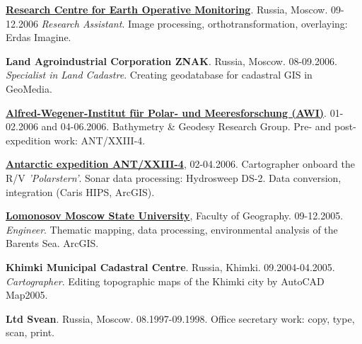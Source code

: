 \documentclass[10pt]{article}
\renewcommand{\section}[2]%
        {\pagebreak[2]\vspace{1.3\baselineskip}%
         \phantomsection\addcontentsline{toc}{section}{#1}%
         \hspace{0in}%
         \marginpar{
         \raggedright \scshape #1}#2}
\begin{document}
\href{http://eng.ntsomz.ru/}{\textbf{Research Centre for Earth Operative Monitoring}}. Russia, Moscow. 09-12.2006 \textit{Research Assistant}. Image processing, orthotransformation, overlaying: Erdas Imagine.
\vspace{5pt}

\textbf{Land Agroindustrial Corporation ZNAK}. Russia, Moscow. 08-09.2006. \textit{Specialist in Land Cadastre}. Creating geodatabase for cadastral GIS in GeoMedia.
\vspace{5pt}

\href{https://www.awi.de/}{\textbf{Alfred-Wegener-Institut f\"{u}r Polar- und Meeresforschung (AWI)}}. 01-02.2006 and 04-06.2006. Bathymetry \& Geodesy Research Group. Pre- and post-expedition work: ANT/XXIII-4.
\vspace{5pt}

\href{http://www.ats.aq/documents/ie/deanu06e.pdf}{\textbf{Antarctic expedition ANT/XXIII-4}}, 02-04.2006. Cartographer onboard the R/V \textit{'Polarstern'}. Sonar data processing: Hydrosweep DS-2. Data conversion, integration (Caris HIPS, ArcGIS). 
\vspace{5pt}

\href{http://www.msu.ru/en/}{\textbf{Lomonosov Moscow State University}}, Faculty of Geography. 09-12.2005. \textit{Engineer}. Thematic mapping, data processing, environmental analysis of the Barents Sea. ArcGIS.
\vspace{5pt}

\textbf{Khimki Municipal Cadastral Centre}. Russia, Khimki. 09.2004-04.2005. \textit{Cartographer}. Editing topographic maps of the Khimki city by AutoCAD Map2005. 
\vspace{5pt}

\textbf{Ltd Svean}. Russia, Moscow. 08.1997-09.1998. Office secretary work: copy, type, scan, print. 


 
\end{document}
